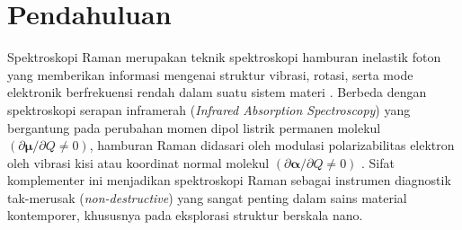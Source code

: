 \section{Pendahuluan}
\label{sec:pendahuluan}

Spektroskopi Raman merupakan teknik spektroskopi hamburan inelastik foton yang memberikan informasi mengenai struktur vibrasi, rotasi, serta mode elektronik berfrekuensi rendah dalam suatu sistem materi \cite{raman1928new,long2002raman}. Berbeda dengan spektroskopi serapan inframerah (\textit{Infrared Absorption Spectroscopy}) yang bergantung pada perubahan momen dipol listrik permanen molekul $(\partial \boldsymbol{\mu}/\partial Q \neq 0)$, hamburan Raman didasari oleh modulasi polarizabilitas elektron oleh vibrasi kisi atau koordinat normal molekul $(\partial \boldsymbol{\alpha}/\partial Q \neq 0)$ \cite{bernath2020spectra}. Sifat komplementer ini menjadikan spektroskopi Raman sebagai instrumen diagnostik tak-merusak (\textit{non-destructive}) yang sangat penting dalam sains material kontemporer, khususnya pada eksplorasi struktur berskala nano.

